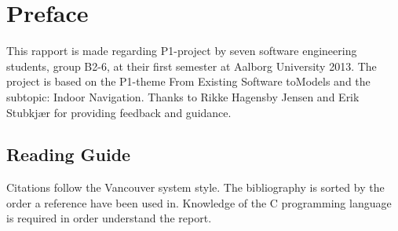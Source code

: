 \chapter*{Preface}
This rapport is made regarding P1-project by seven software engineering students,
group B2-6, at their first semester at Aalborg University 2013. The project is based
on the P1-theme From Existing Software toModels and the subtopic: Indoor Navigation.
Thanks to Rikke Hagensby Jensen and Erik Stubkjær for providing feedback and
guidance.

\section*{Reading Guide}
Citations follow the Vancouver system style. The bibliography is sorted by the order a
reference have been used in. Knowledge of the C programming language is required in
order understand the report.